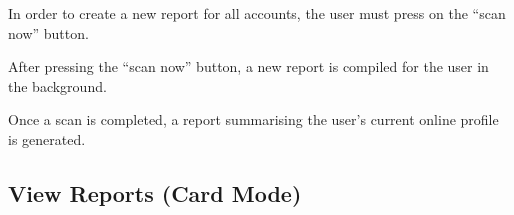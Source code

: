 \begin{minipage}{\textwidth}
  \centering
  \begin{minipage}[t]{4.6cm}
    \vspace{0pt}
    \centering
    \begin{minipage}{4.4cm}
      In order to create a new report for all accounts, the user must press on the ``scan now'' button.
    \end{minipage}
  \end{minipage}
  \begin{minipage}[t]{4.6cm}
    \vspace{0pt}
    \centering
    \begin{minipage}{4.4cm}
      After pressing the ``scan now'' button, a new report is compiled for the user in the background.
    \end{minipage}
  \end{minipage}
  \begin{minipage}[t]{4.6cm}
    \vspace{0pt}
    \centering
    \begin{minipage}{4.4cm}
      Once a scan is completed, a report summarising the user's current online profile is generated.
    \end{minipage}
  \end{minipage}
\end{minipage}

\clearpage

\subsection{View Reports (Card Mode)}

